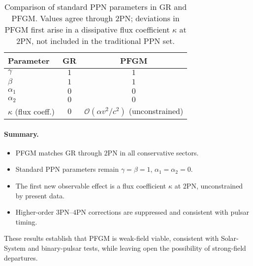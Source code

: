 \documentclass{article}
\begin{document}
\begin{table}[h!]
\centering
\caption{Comparison of standard PPN parameters in GR and PFGM. Values agree through $2$PN; deviations in PFGM first arise in a dissipative flux coefficient $\kappa$ at $2$PN, not included in the traditional PPN set.}
\label{tab:PPN}
\begin{tabular}{lcc}
\hline\hline
Parameter & GR & PFGM \\
\hline
$\gamma$ & $1$ & $1$ \\
$\beta$  & $1$ & $1$ \\
$\alpha_1$ & $0$ & $0$ \\
$\alpha_2$ & $0$ & $0$ \\
$\kappa$ (flux coeff.) & $0$ & $\mathcal{O}(\alpha v^2/c^2)$ (unconstrained) \\
\hline\hline
\end{tabular}
\end{table}

\paragraph*{Summary.}
\begin{itemize}
\item PFGM matches GR through $2$PN in all conservative sectors.
\item Standard PPN parameters remain $\gamma=\beta=1$, $\alpha_1=\alpha_2=0$.
\item The first new observable effect is a flux coefficient $\kappa$ at $2$PN, unconstrained by present data.
\item Higher-order $3$PN--$4$PN corrections are suppressed and consistent with pulsar timing.
\end{itemize}
These results establish that PFGM is weak-field viable, consistent with Solar-System and binary-pulsar tests, while leaving open the possibility of strong-field departures.

\end{document}
